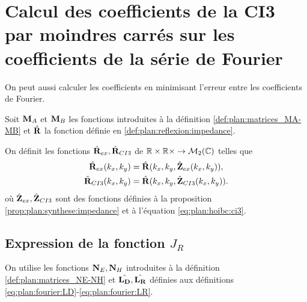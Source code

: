 \section{Calcul des coefficients de la CI3 par moindres carrés sur les coefficients de la série de Fourier}

  On peut aussi calculer les coefficients en minimisant l'erreur entre les coefficients de Fourier.

  Soit \(\mathbf{M}_A\) et \(\mathbf{M}_B\) les fonctions introduites à la définition \ref{def:plan:matrices_MA-MB} et \(\hat{\mathbf{R}}\) la fonction définie en \ref{def:plan:reflexion:impedance}.

  \begin{defn}%
    \label{def:plan:minimisation:matrices_MR}
    On définit les fonctions \(\hat{\mathbf{R}}_{ex}, \hat{\mathbf{R}}_{CI3}\) de \(\mathbb R\times\mathbb R\times \rightarrow \mathcal{M}_2(\mathbb C)\) telles que
    \begin{align*}
      \hat{\mathbf{R}}_{ex}(k_x,k_y) &= \hat{\mathbf{R}}(k_x,k_y, \hat{\mathbf{Z}}_{ex}(k_x,k_y)),
      \\
      \hat{\mathbf{R}}_{CI3}(k_x,k_y) &= \hat{\mathbf{R}}(k_x,k_y, \hat{\mathbf{Z}}_{CI3}(k_x,k_y)).
    \end{align*}
    où \(\hat{\mathbf{Z}}_{ex},\hat{\mathbf{Z}}_{CI3}\) sont des fonctions définies à la proposition \ref{prop:plan:synthese:impedance} et à l'équation \eqref{eq:plan:hoibc:ci3}.
  \end{defn}

  \subsection[Expression de la fonction JR]{Expression de la fonction \(J_R\)}

    On utilise les fonctions \(\mathbf{N}_E, \mathbf{N}_H\) introduites à la définition \ref{def:plan:matrices_NE-NH} et \(\hat{\mathbf{L_D}},\hat{\mathbf{L_R}}\) définies aux définitions \ref{eq:plan:fourier:LD}-\ref{eq:plan:fourier:LR}.

